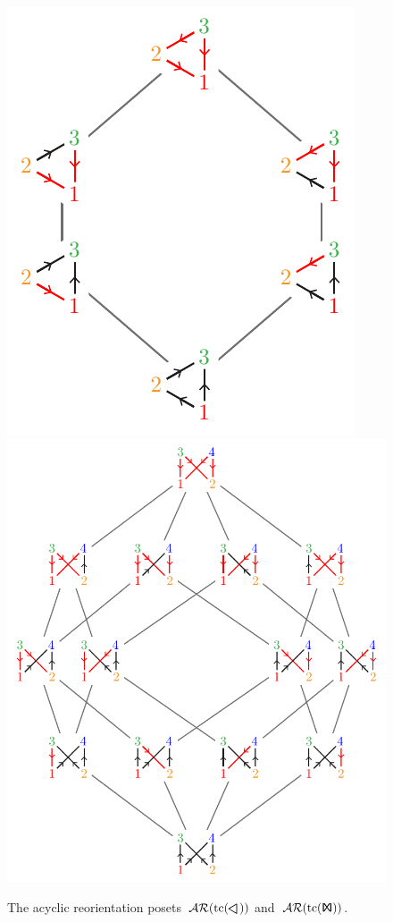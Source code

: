 \documentclass{amsart}
\theoremstyle{definition}
\renewcommand{\c}[1]{\mathcal{#1}} %
\DeclareMathOperator{\tc}{tc} %
\DeclareMathOperator{\AReori}{\c{AR}}  %
\newcommand{\Tgraph}{\sf I\!X\!I} %
\newcommand{\Kgraph}{\rotatebox[origin=c]{90}{$\boldsymbol{\triangle}$}} %
\begin{document}
\begin{figure}
	\centerline{\includegraphics[scale=.68,valign=c]{acyclicReorientationsK}\qquad\includegraphics[scale=.68,valign=c]{acyclicReorientationsT}}
	\caption{The acyclic reorientation posets~$\AReori(\tc(\Kgraph))$ and~$\AReori(\tc(\Tgraph))$.}
	\label{fig:acyclicReorientationsKT}
\end{figure}
\end{document}
